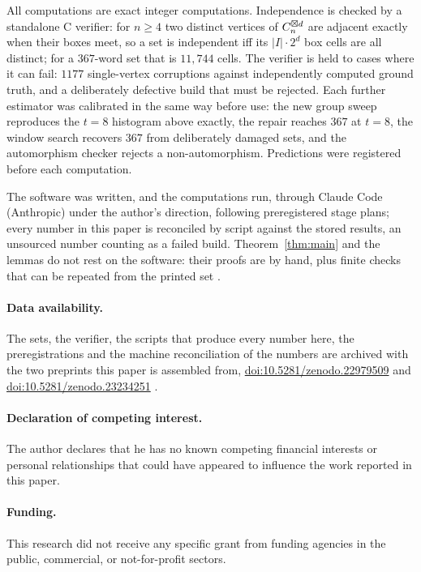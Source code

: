 All computations are exact integer computations. Independence is checked by a standalone C verifier:
for $n\ge4$ two distinct vertices of $C_n^{\boxtimes d}$ are adjacent exactly when their boxes meet, so a
set is independent iff its $|I|\cdot 2^d$ box cells are all distinct; for a $367$-word set that is
$11{,}744$ cells. The verifier is held to cases where it can fail: $1177$ single-vertex corruptions
against independently computed ground truth, and a deliberately defective build that must be rejected.
Each further estimator was calibrated in the same way before use: the new group sweep reproduces the
$t=8$ histogram above exactly, the repair reaches $367$ at $t=8$, the window search recovers $367$ from
deliberately damaged sets, and the automorphism checker rejects a non-automorphism. Predictions were
registered before each computation.

The software was written, and the computations run, through Claude Code (Anthropic) under the author's
direction, following preregistered stage plans; every number in this paper is reconciled by script
against the stored results, an unsourced number counting as a failed build. Theorem~\ref{thm:main} and
the lemmas do not rest on the software: their proofs are by hand, plus finite checks that can be
repeated from the printed set \cite{polak2019}.

\paragraph{Data availability.}
The sets, the verifier, the scripts that produce every number here, the preregistrations and the
machine reconciliation of the numbers are archived with the two preprints this paper is assembled from,
\href{https://doi.org/10.5281/zenodo.22979509}{doi:10.5281/zenodo.22979509} and
\href{https://doi.org/10.5281/zenodo.23234251}{doi:10.5281/zenodo.23234251}
\cite{oktiabrev2026a,oktiabrev2026b,shannonrepo}.

\paragraph{Declaration of competing interest.}
The author declares that he has no known competing financial interests or personal relationships that
could have appeared to influence the work reported in this paper.

\paragraph{Funding.}
This research did not receive any specific grant from funding agencies in the public, commercial, or
not-for-profit sectors.

